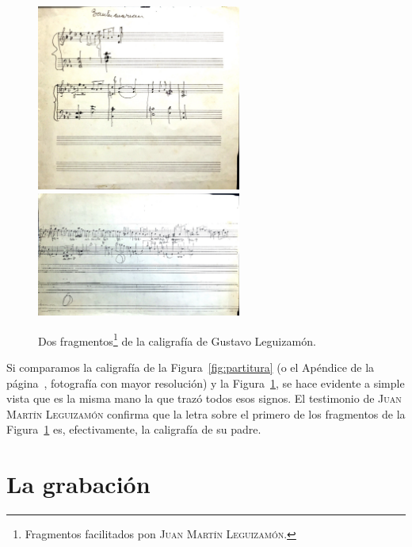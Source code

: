\begin{figure}[H]
\begin{minipage}{\textwidth}
\centering
\includegraphics[width=0.6\textwidth]{img/manuscrito1}\\
\includegraphics[width=0.6\textwidth]{img/manuscrito2}
\caption[Dos fragmentos de la caligrafía de Gustavo Leguizamón.]{Dos fragmentos\footnote{Fragmentos facilitados pon \textsc{Juan Martín Leguizamón}.} de la caligrafía de Gustavo Leguizamón.}
\label{fig:manuscritos}
\end{minipage}
\end{figure}

Si comparamos la caligrafía de la Figura~\ref{fig:partitura} (o el Apéndice de la página~\pageref{apx:partitura}, fotografía con mayor resolución) y la Figura~\ref{fig:manuscritos}, se hace evidente a simple vista que es la misma mano la que trazó todos esos signos. El testimonio de \textsc{Juan Martín Leguizamón} confirma que la letra sobre el primero de los fragmentos de la Figura~\ref{fig:manuscritos} es, efectivamente, la caligrafía de su padre.


\section{La grabación}
\label{sec:grabacion}

